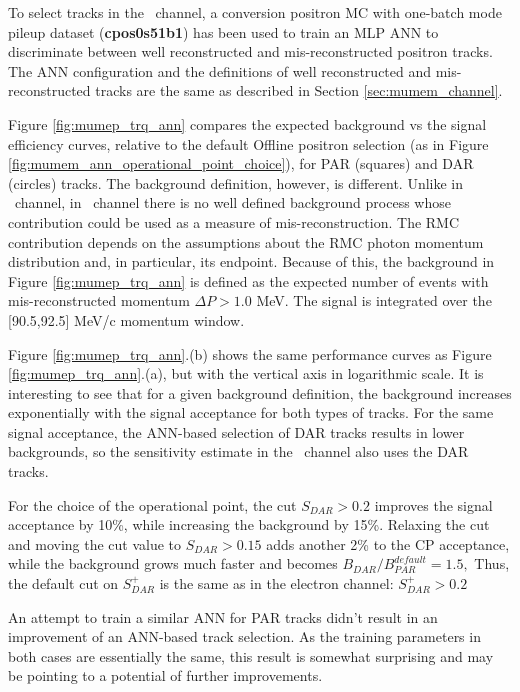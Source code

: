 To select tracks in the \MuToEp\ channel, a conversion positron MC with one-batch mode pileup dataset
({\bf cpos0s51b1}) has been used to train an MLP ANN to discriminate between well reconstructed and
mis-reconstructed positron tracks.
%
The ANN configuration and the definitions of well reconstructed and mis-reconstructed tracks are
the same as described in Section \ref{sec:mumem_channel}.

Figure \ref{fig:mumep_trq_ann} compares the expected background vs the signal efficiency curves,
relative to the default Offline positron selection (as in Figure \ref{fig:mumem_ann_operational_point_choice}),
for PAR (squares) and DAR  (circles) tracks. The background definition, however, is different.
Unlike in \MuToEm\ channel, in \MuToEp\ channel there is no well defined background process whose contribution
could be used as a measure of mis-reconstruction. 
The RMC contribution depends on the assumptions about the RMC photon momentum distribution and,
in particular, its endpoint. Because of this, the background in Figure \ref{fig:mumep_trq_ann} 
is defined as the expected number of events with mis-reconstructed momentum $\Delta{P} > 1.0$ MeV.
%
The signal is integrated over the [90.5,92.5] MeV/c momentum window.

Figure \ref{fig:mumep_trq_ann}.(b) shows the same performance curves as Figure \ref{fig:mumep_trq_ann}.(a),
but with the vertical axis in logarithmic scale. It is interesting to see that for a given background
definition, the background increases exponentially with the signal acceptance for both types of tracks.
For the same signal acceptance, the ANN-based selection of DAR tracks results in lower
backgrounds, so the sensitivity estimate in the \MuToEp\ channel also uses the DAR tracks.

For the choice of the operational point, the cut $S_{DAR} > 0.2$ improves the signal acceptance
by 10\%, while increasing the background by 15\%. Relaxing the cut and moving the cut value to $S_{DAR} > 0.15$
adds another 2\% to the CP acceptance, while the background grows much faster and
becomes $B_{DAR}/B_{PAR}^{default} = 1.5,$ Thus, the default cut on $S_{DAR}^+$ is the same as
in the electron channel:  $S_{DAR}^+ > 0.2$

An attempt to train a similar ANN for PAR tracks didn't result in an improvement of an ANN-based track
selection. As the training parameters in both cases are essentially the same, this result is somewhat 
surprising and may be pointing to a potential of further improvements. 

